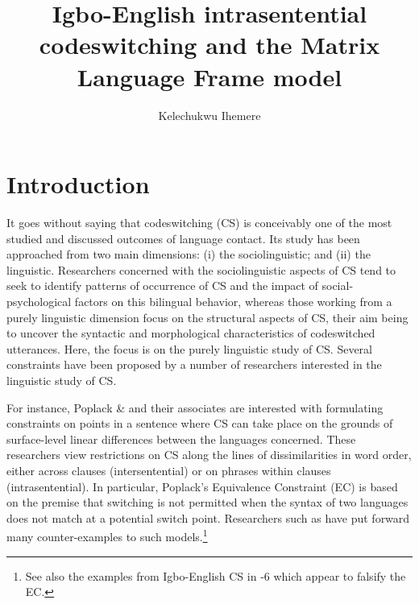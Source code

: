 \documentclass[output=paper]{langsci/langscibook}
\title{Igbo-English intrasentential codeswitching and the Matrix Language Frame model}
\author{%
 Kelechukwu Ihemere \affiliation{University of Westminster, London UK}
}
\begin{document}



 


\section{Introduction}

It goes without saying that codeswitching (CS) is conceivably one of the most studied and discussed outcomes of language contact. Its study has been approached from two main dimensions: (i) the sociolinguistic; and (ii) the linguistic. Researchers concerned with the sociolinguistic aspects of CS tend to seek to identify patterns of occurrence of CS and the impact of social-psychological factors on this bilingual behavior, whereas those working from a purely linguistic dimension focus on the structural aspects of CS, their aim being to uncover the syntactic and morphological characteristics of codeswitched utterances. Here, the focus is on the purely linguistic study of CS. Several constraints have been proposed by a number of researchers interested in the linguistic study of CS.  

For instance, Poplack \& \citet{Meechan1998} and their associates are interested with formulating constraints on points in a sentence where CS can take place on the grounds of surface-level linear differences between the languages concerned. These researchers view restrictions on CS along the lines of dissimilarities in word order, either across clauses (intersentential) or on phrases within clauses (intrasentential). In particular, Poplack’s Equivalence Constraint (EC) is based on the premise that switching is not permitted when the syntax of two languages does not match at a potential switch point. Researchers such as \citet{Bhatt2001} have put forward many counter-examples to such models.\footnote{ See also the examples from Igbo-English CS in -6 which appear to falsify the EC.} 
\end{document}
